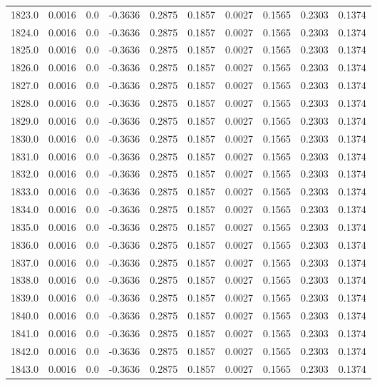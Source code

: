 \begin{longtable}{lrrrrrrrrr}
1823.0 & 0.0016 & 0.0 & -0.3636 & 0.2875 & 0.1857 & 0.0027 & 0.1565 & 0.2303 & 0.1374 \\
1824.0 & 0.0016 & 0.0 & -0.3636 & 0.2875 & 0.1857 & 0.0027 & 0.1565 & 0.2303 & 0.1374 \\
1825.0 & 0.0016 & 0.0 & -0.3636 & 0.2875 & 0.1857 & 0.0027 & 0.1565 & 0.2303 & 0.1374 \\
1826.0 & 0.0016 & 0.0 & -0.3636 & 0.2875 & 0.1857 & 0.0027 & 0.1565 & 0.2303 & 0.1374 \\
1827.0 & 0.0016 & 0.0 & -0.3636 & 0.2875 & 0.1857 & 0.0027 & 0.1565 & 0.2303 & 0.1374 \\
1828.0 & 0.0016 & 0.0 & -0.3636 & 0.2875 & 0.1857 & 0.0027 & 0.1565 & 0.2303 & 0.1374 \\
1829.0 & 0.0016 & 0.0 & -0.3636 & 0.2875 & 0.1857 & 0.0027 & 0.1565 & 0.2303 & 0.1374 \\
1830.0 & 0.0016 & 0.0 & -0.3636 & 0.2875 & 0.1857 & 0.0027 & 0.1565 & 0.2303 & 0.1374 \\
1831.0 & 0.0016 & 0.0 & -0.3636 & 0.2875 & 0.1857 & 0.0027 & 0.1565 & 0.2303 & 0.1374 \\
1832.0 & 0.0016 & 0.0 & -0.3636 & 0.2875 & 0.1857 & 0.0027 & 0.1565 & 0.2303 & 0.1374 \\
1833.0 & 0.0016 & 0.0 & -0.3636 & 0.2875 & 0.1857 & 0.0027 & 0.1565 & 0.2303 & 0.1374 \\
1834.0 & 0.0016 & 0.0 & -0.3636 & 0.2875 & 0.1857 & 0.0027 & 0.1565 & 0.2303 & 0.1374 \\
1835.0 & 0.0016 & 0.0 & -0.3636 & 0.2875 & 0.1857 & 0.0027 & 0.1565 & 0.2303 & 0.1374 \\
1836.0 & 0.0016 & 0.0 & -0.3636 & 0.2875 & 0.1857 & 0.0027 & 0.1565 & 0.2303 & 0.1374 \\
1837.0 & 0.0016 & 0.0 & -0.3636 & 0.2875 & 0.1857 & 0.0027 & 0.1565 & 0.2303 & 0.1374 \\
1838.0 & 0.0016 & 0.0 & -0.3636 & 0.2875 & 0.1857 & 0.0027 & 0.1565 & 0.2303 & 0.1374 \\
1839.0 & 0.0016 & 0.0 & -0.3636 & 0.2875 & 0.1857 & 0.0027 & 0.1565 & 0.2303 & 0.1374 \\
1840.0 & 0.0016 & 0.0 & -0.3636 & 0.2875 & 0.1857 & 0.0027 & 0.1565 & 0.2303 & 0.1374 \\
1841.0 & 0.0016 & 0.0 & -0.3636 & 0.2875 & 0.1857 & 0.0027 & 0.1565 & 0.2303 & 0.1374 \\
1842.0 & 0.0016 & 0.0 & -0.3636 & 0.2875 & 0.1857 & 0.0027 & 0.1565 & 0.2303 & 0.1374 \\
1843.0 & 0.0016 & 0.0 & -0.3636 & 0.2875 & 0.1857 & 0.0027 & 0.1565 & 0.2303 & 0.1374 \\

\end{longtable}
